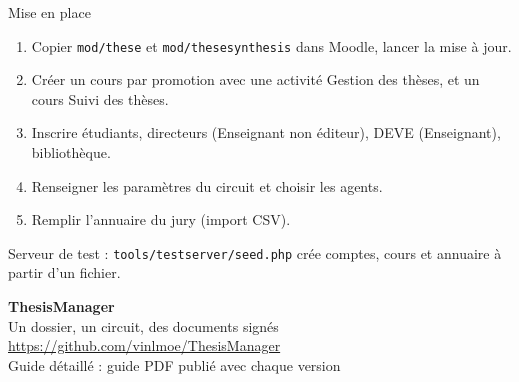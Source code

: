 \documentclass[aspectratio=169,11pt]{beamer}
\begin{document}
\begin{frame}{Mise en place}
  \begin{enumerate}
    \item Copier \texttt{mod/these} et \texttt{mod/thesesynthesis} dans Moodle, lancer la mise à jour.
    \item Créer un cours par promotion avec une activité \og Gestion des thèses\fg{}, et un cours \og Suivi des thèses\fg{}.
    \item Inscrire étudiants, directeurs (Enseignant non éditeur), DEVE (Enseignant), bibliothèque.
    \item Renseigner les \alert{paramètres du circuit} et choisir les agents.
    \item Remplir l'annuaire du jury (import CSV).
  \end{enumerate}
  \vfill
  \small Serveur de test : \texttt{tools/testserver/seed.php} crée comptes, cours et annuaire à partir d'un fichier.
\end{frame}

\begin{frame}[plain]
  \centering
  \vfill
  {\Huge\bfseries\color{moodle} ThesisManager}\\[1em]
  {\large Un dossier, un circuit, des documents signés}\\[2em]
  {\small\color{gris} \url{https://github.com/vinlmoe/ThesisManager}}\\[0.5em]
  {\small\color{gris} Guide détaillé : guide PDF publié avec chaque version}
  \vfill
\end{frame}
\end{document}
